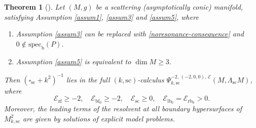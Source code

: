 \documentclass[11pt]{article}
\numberwithin{equation}{section}
\theoremstyle{plain}
\newtheorem{Th}{Theorem}[section]
\theoremstyle{definition}
\newcommand{\bb}{{\mathrm{b}}}
\newcommand{\lfz}{{\mathrm{lb}_0}}
\newcommand{\rfz}{{\mathrm{rb}_0}}
\newcommand{\bbf}{{\mathrm{bf}}}
\newcommand{\bfz}{{\bbf_0}}
\newcommand{\ssc}{{\mathrm{sc}}}
\newcommand{\zf}{{\mathrm{zf}}}
\newcommand{\specb}{\mathrm{spec}_\bb}
\begin{document}
\begin{Th}[{\cite[Th.\,18]{guillarmou2014low}}] \label{initial ACM}
Let $(M,g)$ be a scattering (asymptotically conic) manifold, satisfying
Assumption \ref{assum1}, \ref{assum3} and \ref{assum5}, where
\begin{enumerate}
\item Assumption \ref{assum3} can be replaced with \eqref{noresonance-consequence} and
$0 \notin \specb(P)$.
\item Assumption \ref{assum5} is equivalent to $\dim M \geq 3$.
\end{enumerate}
Then $(\square_{\ssc} + k^{2})^{-1}$
lies in the full $(k,\ssc)$-calculus $\Psi_{k,\ssc}^{-2, \,(-2,0,0),\,\mathcal{E}}(M,\Lambda_\ssc M)$,
where
\[
\mathcal{E}_{\zf} \geq -2,
\quad \mathcal{E}_{\bfz} \geq -2, \quad \mathcal{E}_{\ssc} \geq 0, \quad\mathcal{E}_{\lfz} = \mathcal{E}_{\rfz} >0.
\]
Moreover, the leading terms of the resolvent at all boundary
hypersurfaces of $M^2_{k,\ssc}$ are given by solutions of explicit model problems.
\end{Th}
\end{document}
